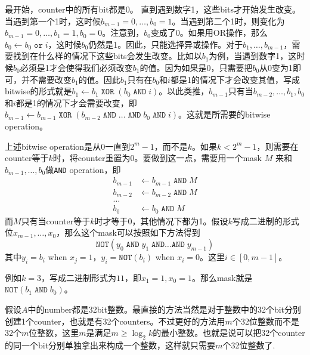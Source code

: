最开始，counter中的所有bit都是0。 直到遇到数字1，这些bits才开始发生改变。当遇到第一个1时，这时候$b_{m-1}=0,\ldots, b_0=1$。当遇到第二个1时，则变化为$b_{m-1}=0,\ldots, b_1=1, b_0=0$。注意到，$b_0$变成了0。如果用OR操作，那么$b_0\gets b_0\;\texttt{or}\; i$，这时候$b_0$仍然是1。因此，只能选择异或操作。对于$b_1,\ldots,b_{m-1}$，需要找到在什么样的情况下这些bits会发生改变。比如以$b_1$为例，当遇到数字1，这时候$b_0$必须是1才会使得我们必须改变$b_1$的值。因为如果是0，只需要把$b_0$从0变为1即可，并不需要改变$b_1$的值。因此$b_1$只有在$b_0$和$i$都是1的情况下才会改变其值，写成bitwise的形式就是$b_1\gets b_1\;\texttt{XOR}\;(b_0\;\texttt{AND}\;i)$。以此类推，$b_{m-1}$只有当$b_{m-2},\ldots,b_1,b_0$和$i$都是1的情况下才会需要改变，即$b_{m-1}\gets b_{m-1}\;\texttt{XOR}\;(b_{m-2}\;\texttt{AND}\;\ldots\;\texttt{AND}\;b_0\;\texttt{AND}\;i)$。这就是所需要的bitwise operation。
\par
上述bitwise operation是从0一直到$2^{m}-1$，而不是$k$。如果$k<2^m-1$，则需要在counter等于$k$时，将counter重置为0。要做到这一点，需要用一个mask $M$ 来和$b_{m-1},\ldots, b_0$做\texttt{AND} operation，即
\begin{align*}
b_{m-1}&\gets b_{m-1}\;\texttt{AND}\;M\\
b_{m-2}&\gets b_{m-2}\;\texttt{AND}\;M\\
\ldots& \\
b_0&\gets b_0\;\texttt{AND}\;M
\end{align*}
而$M$只有当counter等于$k$时才等于0，其他情况下都为1。假设$k$写成二进制的形式位$x_{m-1}, \ldots, x_{0}$，那么这个mask可以按照如下方法得到
\[
\texttt{NOT}(y_0\;\texttt{AND}\;y_1\;\texttt{AND}\ldots\texttt{AND}\;y_{m-1})
\]
其中$y_i=b_i$ when $x_j=1$，$y_i=\texttt{NOT}(b_i)$ when $x_i=0$。这里$i\in[0,m-1]$。
\par
例如$k=3$，写成二进制形式为$11$，即$x_{1}=1,x_0=1$。那么mask就是$\texttt{NOT}(b_1\;\texttt{AND}\;b_0)$。

假设$A$中的number都是32bit整数。最直接的方法当然是对于整数中的32个bit分别创建1个counter，也就是有32个counters。不过更好的方法用$m$个32位整数而不是32个$m$位整数，这里$m$是满足$m\geq\log_2{k}$的最小整数。也就是说可以把32个counter的同一个bit分别单独拿出来构成一个整数，这样就只需要$m$个32位整数了.


